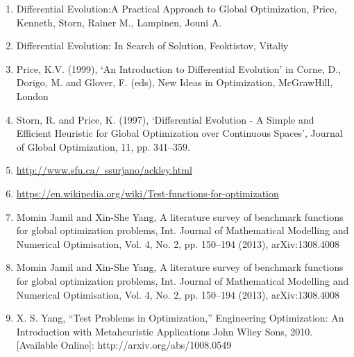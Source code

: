 \documentclass[A4, twocolumn]{article}
\begin{document}
	\begin{enumerate}
		
		\item Differential Evolution:A Practical Approach to Global Optimization, Price, Kenneth, Storn, Rainer M., Lampinen, Jouni A.
		
		\item Differential Evolution: In Search of Solution, Feoktistov, Vitaliy
		
		\item Price, K.V. (1999), ‘An Introduction to Differential Evolution’ in Corne,
		D., Dorigo, M. and Glover, F. (eds), New Ideas in Optimization, McGrawHill,
		London
		
		\item Storn, R. and Price, K. (1997), ‘Differential Evolution - A Simple and Efficient
		Heuristic for Global Optimization over Continuous Spaces’, Journal
		of Global Optimization, 11, pp. 341–359.
		
		\item \href{http://www.sfu.ca/~ssurjano/ackley.html}{http://www.sfu.ca/~ssurjano/ackley.html}
		
		\item \href{https://en.wikipedia.org/wiki/Test_functions_for_optimization}{https://en.wikipedia.org/wiki/Test-functions-for-optimization}

		
		\item Momin Jamil and Xin-She Yang, A literature survey of benchmark functions for global optimization problems, Int. Journal of Mathematical Modelling and Numerical Optimisation, Vol. 4, No. 2, pp. 150–194 (2013), arXiv:1308.4008
		
		\item Momin Jamil and Xin-She Yang, A literature survey of benchmark functions for global optimization problems, Int. Journal of Mathematical Modelling and Numerical Optimisation, Vol. 4, No. 2, pp. 150–194 (2013), arXiv:1308.4008
	
		\item X. S. Yang, “Test Problems in Optimization,” Engineering Optimization: An Introduction with Metaheuristic Applications John Wliey  Sons, 2010. [Available Online]: http://arxiv.org/abs/1008.0549
	\end{enumerate}
	 	
	 
	 
   
\end{document}

